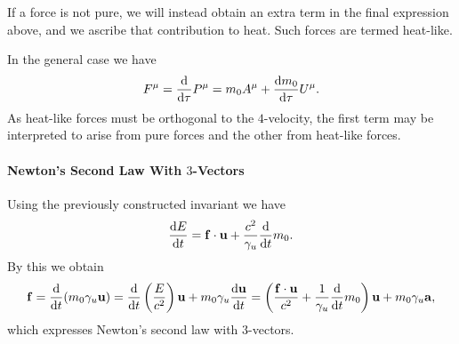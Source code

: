 If a force is not pure, we will instead obtain an extra term in the final expression above, and we ascribe that contribution to heat. Such forces are termed heat-like.

In the general case we have
\begin{align*}
	F^{\mu} = \dv{\tau}P^{\mu} = m_{0}A^{\mu} + \dv{m_{0}}{\tau}U^{\mu}.
\end{align*}
As heat-like forces must be orthogonal to the $4$-velocity, the first term may be interpreted to arise from pure forces and the other from heat-like forces.

\paragraph{Newton's Second Law With $3$-Vectors}
Using the previously constructed invariant we have
\begin{align*}
	\dv{E}{t} = \vb{f}\cdot\vb{u} + \frac{c^{2}}{\gamma_{u}}\dv{t}m_{0}.
\end{align*}
By this we obtain
\begin{align*}
	\vb{f} = \dv{t}(m_{0}\gamma_{u}\vb{u}) = \dv{t}\left(\frac{E}{c^{2}}\right)\vb{u} + m_{0}\gamma_{u}\dv{\vb{u}}{t} = \left(\frac{\vb{f}\cdot\vb{u}}{c^{2}} + \frac{1}{\gamma_{u}}\dv{t}m_{0}\right)\vb{u} + m_{0}\gamma_{u}\vb{a},
\end{align*}
which expresses Newton's second law with $3$-vectors.